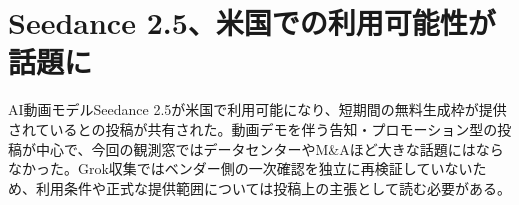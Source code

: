 \section{Seedance 2.5、米国での利用可能性が話題に}
AI動画モデルSeedance 2.5が米国で利用可能になり、短期間の無料生成枠が提供されているとの投稿が共有された。動画デモを伴う告知・プロモーション型の投稿が中心で、今回の観測窓ではデータセンターやM\&Aほど大きな話題にはならなかった。Grok収集ではベンダー側の一次確認を独立に再検証していないため、利用条件や正式な提供範囲については投稿上の主張として読む必要がある。
